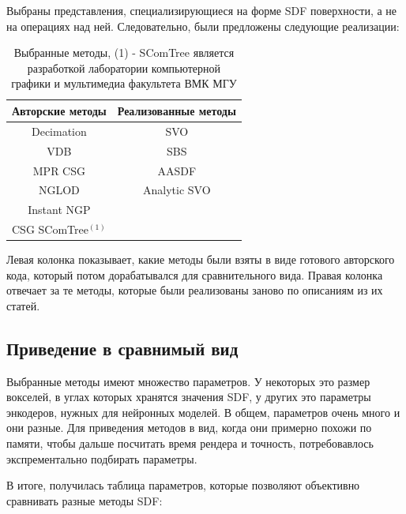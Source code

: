 \documentclass[a4paper,hidelinks,12pt]{article}
\begin{document}
Выбраны представления, специализирующиеся на форме SDF поверхности, а не на операциях над ней. Следовательно, были предложены следующие реализации:

\begin{table}[h!]
	\centering
	\begin{tabular}{|c|c|}
	\hline
	Авторские методы & Реализованные методы \\
	\hline
	Decimation \cite{old_lods}   & SVO \cite{octree_old}  \\
	VDB \cite{vdb}   & SBS \cite{octree}  \\
	MPR CSG \cite{mpr} & AASDF \cite{aasdf} \\
	NGLOD \cite{nglod} & Analytic SVO \cite{octree_analytic} \\
	Instant NGP \cite{ingp} & \\
	CSG SComTree$^{(1)}$ & \\
	\hline
	\end{tabular}
	\caption{Выбранные методы, (1) - SComTree является разработкой лаборатории компьютерной графики и мультимедиа факультета ВМК МГУ}
	\label{tab:twocol}
	\end{table}

	Левая колонка показывает, какие методы были взяты в виде готового авторского кода, который потом дорабатывался для сравнительного вида. Правая колонка 
	отвечает за те методы, которые были реализованы заново по описаниям из их статей.

\subsection{Приведение в сравнимый вид}

Выбранные методы имеют множество параметров. У некоторых это размер вокселей, в углах которых хранятся значения SDF, у других это параметры энкодеров, нужных для 
нейронных моделей. В общем, параметров очень много и они разные. Для приведения методов в вид, когда они примерно похожи по памяти, чтобы дальше посчитать 
время рендера и точность, потребовавлось экспрементально подбирать параметры. 

В итоге, получилась таблица параметров, которые позволяют объективно сравнивать разные методы SDF:
\end{document}
